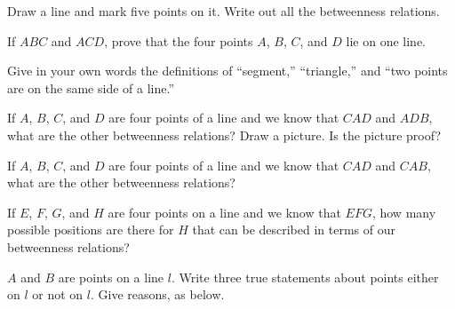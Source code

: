 \documentclass[11pt]{book}
\theoremstyle{bkplain}
\begin{document}
\begin{exercisecols}
\begin{exlist}
\item Draw a line and mark five points on it. Write out all the betweenness
      relations.
\item If $ABC$ and $ACD$, prove that the four points $A$, $B$, $C$, and $D$ lie
      on one line.
\item Give in your own words the definitions of ``segment,'' ``triangle,'' and
      ``two points are on the same side of a line.''
\item If $A$, $B$, $C$, and $D$ are four points of a line and we know that $CAD$
      and $ADB$, what are the other betweenness relations? Draw a picture. Is the
      picture proof?
\item[\stex 5.] If $A$, $B$, $C$, and $D$ are four points of a line and we know
      that $CAD$ and $CAB$, what are the other betweenness relations?
\item[6.] If $E$, $F$, $G$, and $H$ are four points on a line and we know that
      $EFG$, how many possible positions are there for $H$ that can be described
      in terms of our betweenness relations?
\end{exlist}

\begin{exlist}[start=7]
\item $A$ and $B$ are points on a line $l$. Write three true statements about
      points either on $l$ or not on $l$. Give reasons, as below.
\end{exlist}

\begin{steps}
\step{\rule{0.92\linewidth}{0.4pt}}{\rule{0.92\linewidth}{0.4pt}}
\step{\rule{0.92\linewidth}{0.4pt}}{\rule{0.92\linewidth}{0.4pt}}
\step{\rule{0.92\linewidth}{0.4pt}}{\rule{0.92\linewidth}{0.4pt}}
\end{steps}


\end{exercisecols}
\end{document}
